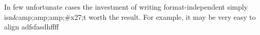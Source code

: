 
In few unfortunate cases the investment of writing format-independent \latex simply isn&amp;amp;amp;#x27;t worth the result. For example, it may be very easy to align adfsfasdhffff